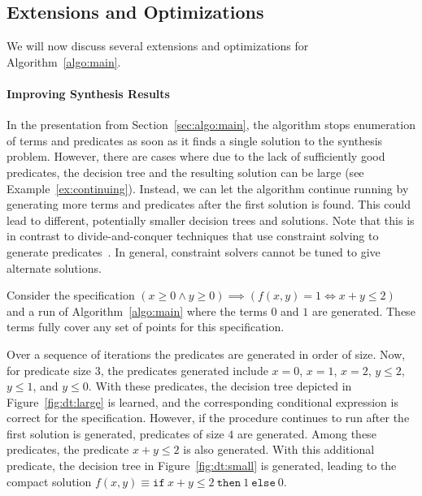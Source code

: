 \documentclass{llncs}
\newcommand\SynthFun{f}
\begin{document}
\subsection{Extensions and Optimizations}
\label{sec:optimizations}

We will now discuss several extensions and optimizations for
Algorithm~\ref{algo:main}.


\paragraph{Improving Synthesis Results}
In the presentation from Section~\ref{sec:algo:main}, the algorithm
stops enumeration of terms and predicates as soon as it finds a single
solution to the synthesis problem.
However, there are cases where due to the lack of sufficiently good
predicates, the decision tree and the resulting solution can be large
(see Example~\ref{ex:continuing}).
Instead, we can let the algorithm continue running by generating more
terms and predicates after the first solution is found.
This could lead to different, potentially smaller decision trees and
solutions.
Note that this is in contrast to divide-and-conquer techniques that use
constraint solving to generate predicates~\cite{Madhu,ACR15}.
In general, constraint solvers cannot be tuned to give alternate
solutions.

\begin{example}
  \label{ex:continuing}
  Consider the specification $(x \geq 0 \wedge y \geq 0) \implies (\SynthFun(x, y) = 1
  \Leftrightarrow x + y \leq 2)$ and a run of Algorithm~\ref{algo:main}
  where the terms $0$ and $1$ are generated.
  These terms fully cover any set of points for this specification.

  Over a sequence of iterations the predicates are generated in order of
  size.
  Now, for predicate size $3$, the predicates generated include $x = 0$,
  $x = 1$, $x = 2$, $y \leq 2$, $y \leq 1$, and $y \leq 0$.
  With these predicates, the decision tree depicted in
  Figure~\ref{fig:dt:large} is learned, and the corresponding
  conditional expression is correct for the specification.
  However, if the procedure continues to run after the first solution is
  generated, predicates of size $4$ are generated.
  Among these predicates, the predicate $x + y \leq 2$ is also
  generated.
  With this additional predicate, the decision tree in
  Figure~\ref{fig:dt:small} is generated, leading to the compact
  solution $\SynthFun(x, y) \equiv \mathtt{if}~x + y \leq
  2~\mathtt{then}~1~\mathtt{else}~0$.
\end{example}
\end{document}
